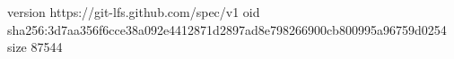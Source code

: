 version https://git-lfs.github.com/spec/v1
oid sha256:3d7aa356f6cce38a092e4412871d2897ad8e798266900cb800995a96759d0254
size 87544
